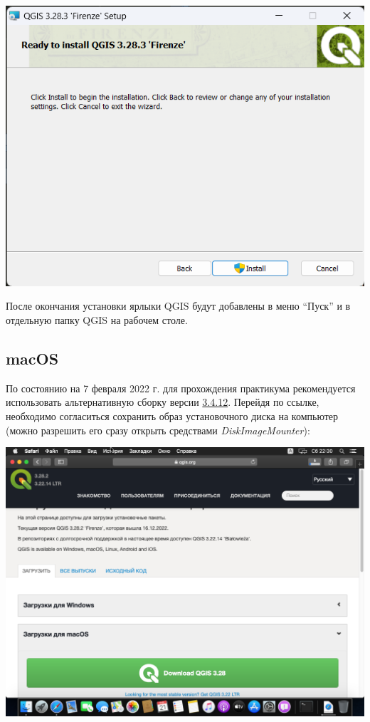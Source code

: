 \documentclass[
  12pt,
]{book}
\begin{document}
\includegraphics{images/installation_instruction_win/win04.png}

После окончания установки ярлыки QGIS будут добавлены в меню ``Пуск'' и в отдельную папку QGIS на рабочем столе.

\hypertarget{macos}{%
\subsection*{macOS}\label{macos}}

По состоянию на 7 февраля 2022 г. для прохождения практикума рекомендуется использовать альтернативную сборку версии \href{https://www.kyngchaos.com/files/software/qgis/QGIS-macOS-3.4.12-1.dmg}{3.4.12}. Перейдя по ссылке, необходимо согласиться сохранить образ установочного диска на компьютер (можно разрешить его сразу открыть средствами \emph{DiskImageMounter}):

\includegraphics{images/installation_instruction_mac/mac01.png}
\end{document}
